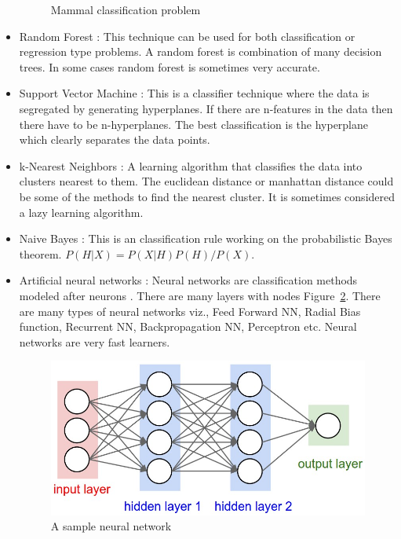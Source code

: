 \begin{itemize}
\begin{figure}[H]
		\centering
		\caption{Mammal classification problem}
		\label{fig:decisiontree}
	\end{figure}
	\item Random Forest : This technique can be used for both classification or regression type problems. A random forest is combination of many decision trees. In some cases random forest is sometimes very accurate.
	\item Support Vector Machine : This is a classifier technique where the data is segregated by generating hyperplanes. If there are n-features in the data then there have to be n-hyperplanes. The best classification is the hyperplane which clearly separates the data points.
	\item k-Nearest Neighbors : A learning algorithm that classifies the data into clusters nearest to them. The euclidean distance or manhattan distance could be some of the methods to find the nearest cluster. It is sometimes considered a lazy learning algorithm.
	\item Naive Bayes : This is an classification rule working on the probabilistic Bayes theorem.\newline
	 \(P(H|X) = P(X|H) P(H)/P(X)\).\newline
	\item Artificial neural networks : Neural networks are classification methods modeled after neurons . There are many layers with nodes Figure~\ref{fig:neuralnet}. There are many types of neural networks viz., Feed Forward NN, Radial Bias function, Recurrent NN, Backpropagation NN, Perceptron etc. Neural networks are very fast learners.
	\begin{figure}[H]
		\includegraphics[scale = 0.5]{figures/neural_net2.jpeg}
		\centering
		\caption{A sample neural network}
		\label{fig:neuralnet}
	\end{figure}
\end{itemize}

